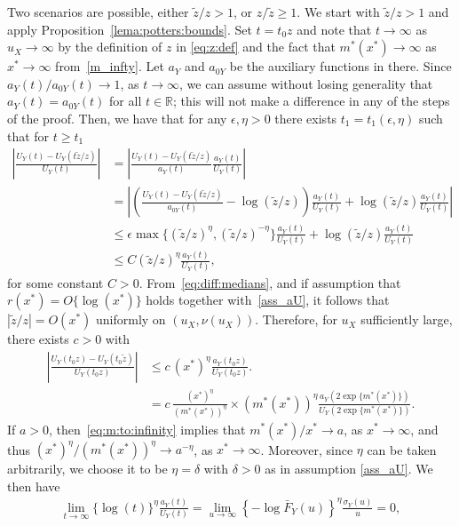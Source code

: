 \documentclass{statsoc}
\theoremstyle{break}
\newcommand{\tzero}{t_0}
\begin{document}
Two scenarios are possible, either $\tilde z/ z > 1$, or $ z/  \tilde z \geq 1 $. 
We start with $\tilde z/z > 1$ and apply Proposition~\ref{lema:potters:bounds}. 
Set $t = t_0  z$ and note that $t\to \infty$ as $u_X \to \infty$ 
by the definition of $z$ in \eqref{eq:z:def} and the fact that $m^*(x^*) \to \infty$ 
as $x^* \to \infty$ from~\eqref{m_infty}.
Let $a_Y$ and $a_{0Y}$ be the auxiliary functions in there. Since $a_Y(t)/a_{0Y}(t) \to 1$, as $t \to \infty$, we can assume without losing generality that $a_Y(t) = a_{0Y}(t)$ for all $t\in\mathbb R$; this will not make a difference in any of the steps of the proof.
Then, we have that for any $\epsilon, \eta > 0$ there exists $t_1 = t_1(\epsilon,\eta)$ such that for $t\geq t_1$
\begin{align*}
	\left| \frac{U_Y(t) - U_Y(t \tilde z/z )}{ U_Y(t)} \right| &=   
	\left| \frac{U_Y(t) - U_Y(t \tilde z/z )}{ a_{Y}(t)} 
	\frac{a_{Y} (t)}{U_Y(t)}
	\right|  \\
	&= 	\left| \left( \frac{U_Y(t) - U_Y(t \tilde z/z )}{ a_{0Y}(t)} - \log(\tilde z /z )
	\right) \frac{a_{Y} (t)}{U_Y(t)}  + \log(\tilde z /z ) \frac{a_{Y} (t)}{U_Y(t)}
	\right| \\
	&\leq \epsilon \max\{(\tilde z / z)^\eta, (\tilde z / z)^{-\eta}\} \frac{a_{Y} (t)}{U_Y(t)} + \log(\tilde z/ z)\frac{a_{Y} (t)}{U_Y(t)}\\
	&\leq   C (\tilde z / z)^\eta \frac{a_{Y} (t)}{U_Y(t)} , 
\end{align*}
for some constant $C>0$.
From~\eqref{eq:diff:medians}, and if assumption that $r(x^*) = O\{\log(x^*)\}$ holds together with~\eqref{ass_aU}, it follows that  $|\tilde z/z| = O(x^*)$ uniformly on $(u_X, \nu(u_X))$.
Therefore, for $u_X$ sufficiently large, there exists $c > 0$ with
\begin{align}\label{eq:argument}
	\left|  \frac{U_Y(\tzero z) - U_Y(\tzero \tilde z)}{ U_Y(\tzero z)} \right| 
	& \leq   c\, (x^*)^\eta  \frac{a_Y(t_0 z)}{U_Y(\tzero z)}. \nonumber \\
	& =  c\, \frac{(x^*)^\eta }{ (m^*(x^*))^{\eta}}  \times (m^*(x^*))^{\eta}\frac{a_Y(2\exp\{m^*(x^*)\})}{U_Y(2\exp\{m^*(x^*)\})}.
\end{align}
If $a > 0$, then~\eqref{eq:m:to:infinity} implies that $m^*(x^*)/x^* \to a$, as $x^* \to \infty$, and thus $(x^*)^\eta / (m^*(x^*))^{\eta}  \to a^{-\eta}$, as $x^* \to \infty$. 
Moreover, since $\eta$ can be taken arbitrarily, we choose it to be $\eta = \delta$ with $\delta > 0$ as in assumption \eqref{ass_aU}. We then have
\begin{align*}
	\lim_{t \to \infty } \{ \log(t)\}^{\eta} \frac{a_Y(t)}{U_Y(t)} = \lim_{u \to \infty} \left\{-\log \bar F_Y(u)  \right\}^\eta \frac{\sigma_Y(u)}{ u } = 0,
\end{align*}
\end{document}
